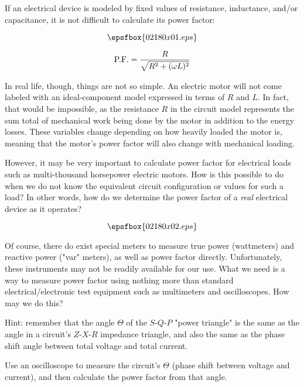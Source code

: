 

If an electrical device is modeled by fixed values of resistance, inductance, and/or capacitance, it is not difficult to calculate its power factor:

$$\epsfbox{02180x01.eps}$$

$$\hbox{P.F.} = {R \over {\sqrt{R^2 + ({\omega L})^2}}}$$

In real life, though, things are not so simple.  An electric motor will not come labeled with an ideal-component model expressed in terms of $R$ and $L$.  In fact, that would be impossible, as the resistance $R$ in the circuit model represents the sum total of mechanical work being done by the motor in addition to the energy losses.  These variables change depending on how heavily loaded the motor is, meaning that the motor's power factor will also change with mechanical loading.

However, it may be very important to calculate power factor for electrical loads such as multi-thousand horsepower electric motors.  How is this possible to do when we do not know the equivalent circuit configuration or values for such a load?  In other words, how do we determine the power factor of a {\it real} electrical device as it operates?

$$\epsfbox{02180x02.eps}$$

Of course, there do exist special meters to measure true power (wattmeters) and reactive power ("var" meters), as well as power factor directly.  Unfortunately, these instruments may not be readily available for our use.  What we need is a way to measure power factor using nothing more than standard electrical/electronic test equipment such as multimeters and oscilloscopes.  How may we do this?

\vskip 10pt

Hint: remember that the angle $\Theta$ of the $S$-$Q$-$P$ "power triangle" is the same as the angle in a circuit's $Z$-$X$-$R$ impedance triangle, and also the same as the phase shift angle between total voltage and total current.







Use an oscilloscope to measure the circuit's $\Theta$ (phase shift between voltage and current), and then calculate the power factor from that angle.


